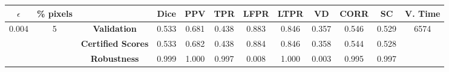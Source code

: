 \begin{longtable}{ c  c | c | c  c  c  c  c  c  c c c}
\toprule \textbf{$\epsilon$} & \textbf{\% pixels} & & \textbf{Dice} & \textbf{PPV} & \textbf{TPR} & \textbf{LFPR} & \textbf{LTPR} & \textbf{VD} & \textbf{CORR} & \textbf{SC} & \textbf{V. Time} \\
\midrule 
\multirow{3}{*}{0.004}  & \multirow{3}{*}{5} &\textbf{Validation} & 0.533 & 0.681 & 0.438 & 0.883 & 0.846 & 0.357 & 0.546 & 0.529 & \multirow{3}{*}{6574} \\
 & & \textbf{Certified Scores} & 0.533 & 0.682 & 0.438 & 0.884 & 0.846 & 0.358 & 0.544 & 0.528 & \\
& & \textbf{Robustness} & 0.999 & 1.000 & 0.997 & 0.008 & 1.000 & 0.003 & 0.995 & 0.997 & \\
\end{longtable}